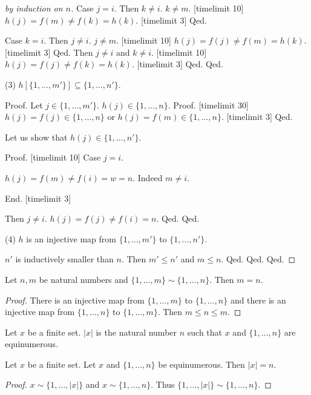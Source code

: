 \documentclass{article}
\newcommand{\Seq}[2]{\{#1,\dots,#2\}}
\begin{document}
\begin{forthel}
\begin{proof}[by induction on $n$]
  Case $j = i$.
  Then $k \neq i$. $k \neq m$. [timelimit 10]
  $h(j) = f(m) \neq f(k) = h(k)$. [timelimit 3]
  Qed.

  Case $k = i$.
  Then $j \neq i$. $j \neq m$. [timelimit 10]
  $h(j) = f(j) \neq f(m) = h(k)$. [timelimit 3]
  Qed.
  Then $j \neq i$ and $k \neq i$. [timelimit 10]
  $h(j) = f(j) \neq f(k) = h(k)$. [timelimit 3]
  Qed.
  Qed.

(3)  $h[\Seq{1}{m'}] \subseteq \Seq{1}{n'}$.

Proof.
  Let $j \in \Seq{1}{m'}$.
  $h(j) \in \Seq{1}{n}$.
  Proof.
  [timelimit 30]
  $h(j) = f(j) \in \Seq{1}{n}$ or $h(j) = f(m) \in \Seq{1}{n}$.
  [timelimit 3]
  Qed.

  Let us show that  $h(j) \in \Seq{1}{n'}$.

  Proof.
[timelimit 10]
    Case $j = i$.

    $h(j) = f(m) \neq f(i) = w = n$. Indeed $m \neq i$.

End.
[timelimit 3]

    Then $j \neq i$.
    $h(j) = f(j) \neq f(i) = n$.
  Qed.
  Qed.

(4) $h$ is an injective map from $\Seq{1}{m'}$ to $\Seq{1}{n'}$.

  $n'$ is inductively smaller than $n$.
Then $m' \leq n'$ and $m \leq n$.
  Qed.
  Qed.
  Qed.
  \end{proof}


  \begin{lemma}
  Let $n,m$ be natural numbers and
  $\Seq{1}{m} \sim \Seq{1}{n}$. Then $m = n$.
  \end{lemma}
  \begin{proof}
  There is an injective map from
  $\Seq{1}{m}$ to $\Seq{1}{n}$ and
  there is an injective map from
  $\Seq{1}{n}$ to $\Seq{1}{m}$. Then $m \leq n \leq m$.
  \end{proof}

  \begin{signature}
  Let $x$ be a finite set. $|x|$ is the natural number $n$
  such that $x$ and $\Seq{1}{n}$ are equinumerous.
  \end{signature}

  \begin{lemma} Let $x$ be a finite set.
  Let $x$ and $\Seq{1}{n}$ be equinumerous. Then
  $|x| = n$.
  \end{lemma}
  \begin{proof}
  $x \sim \Seq{1}{|x|}$ and $x \sim \Seq{1}{n}$. Thus $\Seq{1}{|x|} \sim \Seq{1}{n}$.
  \end{proof}


\end{forthel}
\end{document}
